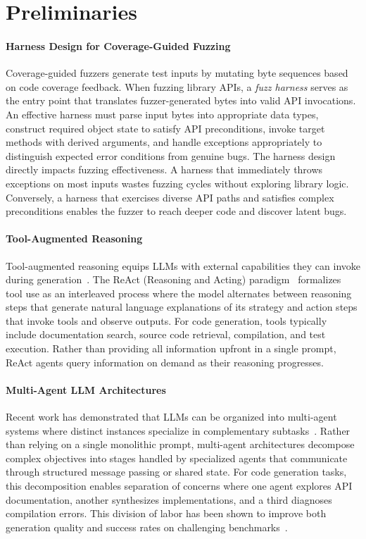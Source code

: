 
\section{Preliminaries}

\paragraph{Harness Design for Coverage-Guided Fuzzing}
Coverage-guided fuzzers generate test inputs by mutating byte sequences based on code coverage feedback. When fuzzing library APIs, a \emph{fuzz harness} serves as the entry point that translates fuzzer-generated bytes into valid API invocations. An effective harness must parse input bytes into appropriate data types, construct required object state to satisfy API preconditions, invoke target methods with derived arguments, and handle exceptions appropriately to distinguish expected error conditions from genuine bugs. The harness design directly impacts fuzzing effectiveness. A harness that immediately throws exceptions on most inputs wastes fuzzing cycles without exploring library logic. Conversely, a harness that exercises diverse API paths and satisfies complex preconditions enables the fuzzer to reach deeper code and discover latent bugs.

\paragraph{Tool-Augmented Reasoning}
Tool-augmented reasoning equips LLMs with external capabilities they can invoke during generation~\cite{DBLP:conf/nips/SchickDSHWSCSW23:Toolformer,CITE:ToolLLM}. The ReAct (Reasoning and Acting) paradigm~\cite{DBLP:conf/iclr:YaoZYDN023:ReAct} formalizes tool use as an interleaved process where the model alternates between reasoning steps that generate natural language explanations of its strategy and action steps that invoke tools and observe outputs. For code generation, tools typically include documentation search, source code retrieval, compilation, and test execution. Rather than providing all information upfront in a single prompt, ReAct agents query information on demand as their reasoning progresses.

\paragraph{Multi-Agent LLM Architectures}
Recent work has demonstrated that LLMs can be organized into multi-agent systems where distinct instances specialize in complementary subtasks~\cite{CITE:MultiAgentCode}. Rather than relying on a single monolithic prompt, multi-agent architectures decompose complex objectives into stages handled by specialized agents that communicate through structured message passing or shared state. For code generation tasks, this decomposition enables separation of concerns where one agent explores API documentation, another synthesizes implementations, and a third diagnoses compilation errors. This division of labor has been shown to improve both generation quality and success rates on challenging benchmarks~\cite{CITE:AgentBench}.

